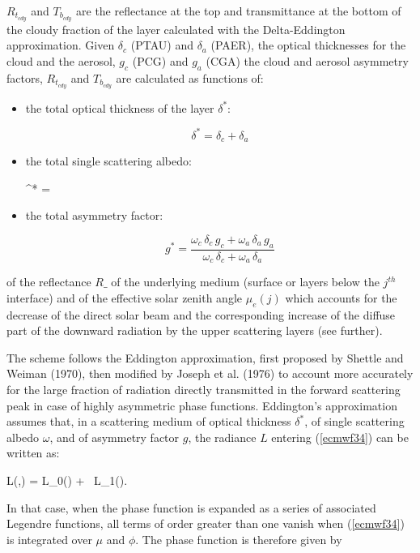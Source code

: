 $R_{t_{cdy}}$ and $T_{b_{cdy}}$ are the reflectance at the top and transmittance
at the bottom of the cloudy fraction of the layer calculated with the
Delta-Eddington approximation. Given $\delta_c$ (PTAU) and $\delta_a$ (PAER), the optical thicknesses for the cloud and the aerosol, $g_c$ (PCG) and $g_a$ (CGA) the cloud and aerosol
asymmetry factors, $R_{t_{cdy}}$ and $T_{b_{cdy}}$ are calculated as functions of:

\begin{itemize}
\item{the total optical thickness of the layer $\delta^{*}$:}

\[
\delta^{*} = \delta_c + \delta_a 
\]

\item{the total single scattering albedo:}

\be
\omega^{*} = 
\label{ecmwf314}
\ee

\item{the total asymmetry factor:}

\[
g^{*} = \frac{\omega_c  \, \delta_c  \,  g_c+ \omega_a  \, \delta_a  \, g_a}
{\omega_c  \, \delta_c+ \omega_a  \, \delta_a}
\]
\end{itemize}


\noindent of the reflectance $R\_$ of the underlying medium (surface or layers
below the $j^{th}$ interface) and of the effective solar zenith angle $\mu_e(j)$
which accounts for the decrease of the direct solar beam and the corresponding
increase of the diffuse part of the downward radiation by the upper scattering
layers (see further).

The scheme follows the Eddington approximation, first proposed by Shettle and Weiman (1970), then modified by Joseph et al. (1976) to account more accurately for the large fraction of radiation directly transmitted in the forward scattering peak in case of highly asymmetric phase functions. Eddington's approximation assumes that, in a scattering medium of optical thickness $\delta^{*}$, of single scattering albedo $\omega$, and of asymmetry factor $g$, the radiance $L$ entering (\ref{ecmwf34}) can be written as:

\medskip
\be
L(\delta,\mu) = L_0(\delta) + \mu \, L_1(\delta).
\label{ecmwf317}
\ee
\medskip

In that case, when the phase function is expanded as a series of associated Legendre functions, all terms of order greater than one vanish when (\ref{ecmwf34}) is integrated over $\mu$ and $\phi$. The phase function is therefore given by

